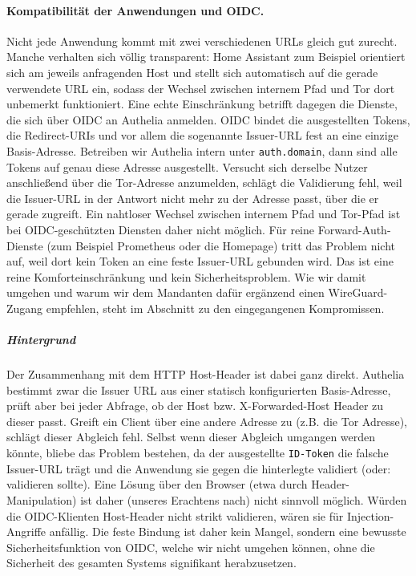 \paragraph{Kompatibilität der Anwendungen und \ac{OIDC}.}
Nicht jede Anwendung kommt mit zwei verschiedenen \ac{URL}s gleich gut zurecht. Manche
verhalten sich völlig transparent: Home Assistant zum Beispiel orientiert sich am
jeweils anfragenden Host und stellt sich automatisch auf die gerade verwendete
\ac{URL} ein, sodass der Wechsel zwischen internem Pfad und Tor dort unbemerkt
funktioniert. Eine echte Einschränkung betrifft dagegen die Dienste, die sich
über \ac{OIDC} an Authelia anmelden. \ac{OIDC} bindet die ausgestellten Tokens, die Redirect-\acp{URI}
und vor allem die sogenannte Issuer-\ac{URL} fest an eine einzige Basis-Adresse.
Betreiben wir Authelia intern unter \texttt{auth.domain}, dann sind alle Tokens
auf genau diese Adresse ausgestellt. Versucht sich derselbe Nutzer anschließend
über die Tor-Adresse anzumelden, schlägt die Validierung fehl, weil die
Issuer-\ac{URL} in der Antwort nicht mehr zu der Adresse passt, über die er gerade
zugreift. Ein nahtloser Wechsel zwischen internem Pfad und Tor-Pfad ist bei
\ac{OIDC}-geschützten Diensten daher nicht möglich. Für reine Forward-Auth-Dienste
(zum Beispiel Prometheus oder die Homepage) tritt das Problem nicht auf, weil
dort kein Token an eine feste Issuer-\ac{URL} gebunden wird. Das ist eine reine
Komforteinschränkung und kein Sicherheitsproblem. Wie wir damit umgehen und
warum wir dem Mandanten dafür ergänzend einen WireGuard-Zugang empfehlen, steht
im Abschnitt zu den eingegangenen Kompromissen.

\subparagraph{Hintergrund}
Der Zusammenhang mit dem \ac{HTTP} Host-Header ist dabei ganz direkt. Authelia bestimmt zwar die Issuer \ac{URL} aus einer statisch konfigurierten Basis-Adresse, prüft aber bei jeder Abfrage, ob der Host bzw. X-Forwarded-Host Header zu dieser passt. Greift ein Client über eine andere Adresse zu (z.B. die Tor Adresse), schlägt dieser Abgleich fehl. Selbst wenn dieser Abgleich umgangen werden könnte, bliebe das Problem bestehen, da der ausgestellte \texttt{\ac{ID}-Token} die falsche Issuer-\ac{URL} trägt und die Anwendung sie gegen die hinterlegte validiert (oder: validieren sollte). Eine Lösung über den Browser (etwa durch Header-Manipulation) ist daher (unseres Erachtens nach) nicht sinnvoll möglich. Würden die \ac{OIDC}-Klienten Host-Header nicht strikt validieren, wären sie für Injection-Angriffe anfällig. Die feste Bindung ist daher kein Mangel, sondern eine bewusste Sicherheitsfunktion von \ac{OIDC}, welche wir nicht umgehen können, ohne die Sicherheit des gesamten Systems signifikant herabzusetzen.

